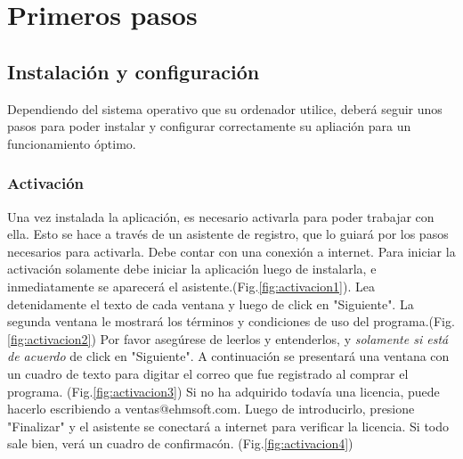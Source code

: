 \chapter{Primeros pasos}
\setcounter{page}{4}

\section{Instalaci\'on y configuraci\'on}
Dependiendo del sistema operativo que su ordenador utilice, deber\'a seguir unos pasos para poder instalar y
configurar correctamente su apliaci\'on para un funcionamiento \'optimo. 
\subsection{\windows}
\subsection{\mac}
\subsection{\linux}
\subsection{Activaci\'on}
Una vez instalada la aplicaci\'on, es necesario activarla para poder trabajar con ella. Esto se hace a trav\'es de un asistente de registro, que lo guiar\'a por los pasos necesarios para activarla. Debe contar con una conexi\'on a internet. Para iniciar la activaci\'on solamente debe iniciar la aplicaci\'on luego de instalarla, e inmediatamente se aparecer\'a el asistente.(Fig.\ref{fig:activacion1}). Lea detenidamente el texto de cada ventana y luego de click en "Siguiente". La segunda ventana le mostrar\'a los t\'erminos y condiciones de uso del programa.(Fig.\ref{fig:activacion2}) Por favor aseg\'urese de leerlos y entenderlos, y \emph{solamente si est\'a de acuerdo} de click en "Siguiente". A continuaci\'on se presentar\'a una ventana con un cuadro de texto para digitar el correo que fue registrado al comprar el programa. (Fig.\ref{fig:activacion3}) Si no ha adquirido todav\'ia una licencia, puede hacerlo escribiendo a \mbox{ventas@ehmsoft.com}. Luego de introducirlo, presione "Finalizar" y el asistente se conectar\'a a internet para verificar la licencia. Si todo sale bien, ver\'a un cuadro de confirmac\'on. (Fig.\ref{fig:activacion4}) 



